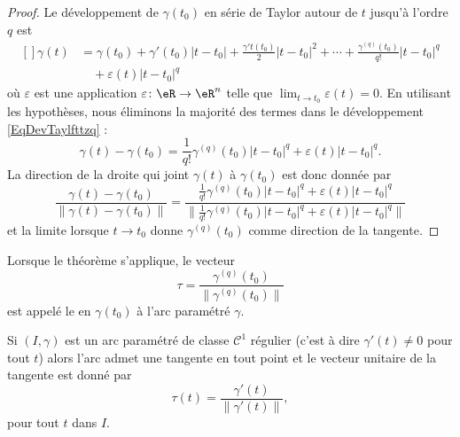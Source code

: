 \begin{proof}

Le développement de $\gamma(t_0)$ en série de Taylor autour de $t$ jusqu'à l'ordre $q$ est
\begin{equation}        \label{EqDevTaylfttzq}
    \begin{aligned}[]
        \gamma(t)&=\gamma(t_0)+\gamma'(t_0)| t-t_0 |+\frac{ \gamma't(t_0) }{2}| t-t_0 |^2+\cdots +\frac{ \gamma^{(q)}(t_0) }{ q! }| t-t_0 |^q\\
            &\quad+\varepsilon(t)| t-t_0 |^q
    \end{aligned}
\end{equation}
où $\varepsilon$ est une application $\varepsilon\colon \eR\to \eR^n$ telle que $\lim_{t\to t_0} \varepsilon(t)=0$. En utilisant les hypothèses, nous éliminons la majorité des termes dans le développement \eqref{EqDevTaylfttzq} :
\begin{equation}
    \gamma(t)-\gamma(t_0)=\frac{1}{ q! }\gamma^{(q)}(t_0)| t-t_0 |^q+\varepsilon(t)| t-t_0 |^q.
\end{equation}
La direction de la droite qui joint $\gamma(t)$ à $\gamma(t_0)$ est donc donnée par
\begin{equation}
    \frac{ \gamma(t)-\gamma(t_0) }{ \| \gamma(t)-\gamma(t_0) \| }=\frac{ \frac{1}{ q! }\gamma^{(q)}(t_0)| t-t_0 |^q+\varepsilon(t)| t-t_0 |^q }{ \| \frac{1}{ q! }\gamma^{(q)}(t_0)| t-t_0 |^q+\varepsilon(t)| t-t_0 |^q\|  }
\end{equation}
et la limite lorsque $t\to t_0$ donne $\gamma^{(q)}(t_0)$ comme direction de la tangente.

\end{proof}

Lorsque le théorème s'applique, le vecteur
\begin{equation}
\tau=\frac{ \gamma^{(q)}(t_0) }{ \| \gamma^{(q)}(t_0) \| }
\end{equation}
est appelé le  en $\gamma(t_0)$ à l'arc paramétré $\gamma$.


\begin{corollary}       \label{CorTgSoCun}
Si $(I,\gamma)$ est un arc paramétré de classe $\mathcal{C}^1$ régulier (c'est à dire $\gamma'(t)\neq 0$ pour tout $t$) alors l'arc admet une tangente en tout point et le vecteur unitaire de la tangente est donné par
\begin{equation}
    \tau(t)=\frac{ \gamma'(t) }{ \| \gamma'(t) \| },
\end{equation}
pour tout $t$ dans $I$.
\end{corollary}

